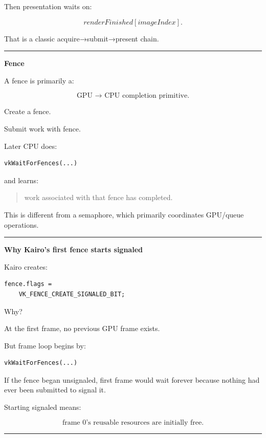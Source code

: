 Then presentation waits on:

\[
renderFinished[imageIndex].
\]

That is a classic acquire→submit→present chain.

\begin{center}\rule{0.5\linewidth}{0.5pt}\end{center}

\textbf{Fence}

A fence is primarily a:

\[
\boxed{\text{GPU → CPU completion primitive}.}
\]

Create a fence.

Submit work with fence.

Later CPU does:

\begin{verbatim}
vkWaitForFences(...)
\end{verbatim}

and learns:

\begin{quote}
work associated with that fence has completed.
\end{quote}

This is different from a semaphore, which primarily coordinates GPU/queue operations.

\begin{center}\rule{0.5\linewidth}{0.5pt}\end{center}

\textbf{Why Kairo's first fence starts signaled}

Kairo creates:

\begin{verbatim}
fence.flags =
    VK_FENCE_CREATE_SIGNALED_BIT;
\end{verbatim}

Why?

At the first frame, no previous GPU frame exists.

But frame loop begins by:

\begin{verbatim}
vkWaitForFences(...)
\end{verbatim}

If the fence began unsignaled, first frame would wait forever because nothing had ever been submitted to signal it.

Starting signaled means:

\[
\boxed{
\text{frame 0's reusable resources are initially free}.
}
\]

\begin{center}\rule{0.5\linewidth}{0.5pt}\end{center}

